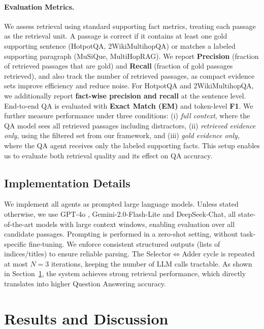 \documentclass{article} %
\begin{document}
\paragraph{Evaluation Metrics.}
We assess retrieval using standard supporting fact metrics, treating each passage as the retrieval unit. A passage is correct if it contains at least one gold supporting sentence (HotpotQA, 2WikiMultihopQA) or matches a labeled supporting paragraph (MuSiQue, MultiHopRAG). We report \textbf{Precision} (fraction of retrieved passages that are gold) and \textbf{Recall} (fraction of gold passages retrieved), and also track 
the number of retrieved passages, as compact evidence sets improve efficiency and reduce noise. For HotpotQA and 2WikiMultihopQA, we additionally report \textbf{fact-wise precision and recall} at the sentence level. End-to-end QA is evaluated with \textbf{Exact Match (EM)} and token-level \textbf{F1}. We further measure performance under three conditions: (i) \textit{full context}, where the QA model sees all 
retrieved passages including distractors, (ii) \textit{retrieved evidence only}, using the filtered set from our framework, and (iii) \textit{gold evidence only}, where the QA agent receives only the labeled supporting facts. This setup enables us to evaluate both retrieval quality and its effect on QA accuracy.

\subsection{Implementation Details}
\label{sec:llms}

We implement all agents as prompted large language models. Unless stated otherwise, we use {GPT-4o} \citep{OpenAI_gpt4o_system_card_2024}, {Gemini-2.0-Flash-Lite}\citep{google_gemini2.5_report_2025} and {DeepSeek-Chat}\citep{deepseek_ai_deepseek-v3_2024}, all state-of-the-art models with large context windows, enabling evaluation over all candidate passages. Prompting is performed in a zero-shot setting, without task-specific fine-tuning. We enforce consistent structured outputs (lists of indices/titles) to ensure reliable parsing. The Selector$\Leftrightarrow$Adder cycle is repeated at most $N=3$ iterations, keeping the number of LLM calls tractable. As shown in Section~\ref{sec:results}, the system achieves strong retrieval performance, which directly translates into higher Question Answering accuracy.  


\section{Results and Discussion}
\label{sec:results}
\end{document}
